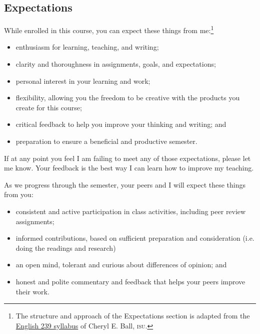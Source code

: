 \documentclass[12pt,oneside]{amsart}	%
\begin{document}




\subsection{Expectations} %
\label{sub:expectations}

While enrolled in this course, you can expect these things from me:\footnote{The structure and approach of the Expectations section is adapted from the \href{http://www.ceball.com/classes/239/spring09/?page_id=8}{English 239 syllabus} of Cheryl E. Ball, \textsc{isu}.}
\begin{itemize}
	\item enthusiasm for learning, teaching, and writing;
	\item clarity and thoroughness in assignments, goals, and expectations;
	\item personal interest in your learning and work;
	\item flexibility, allowing you the freedom to be creative with the products you create for this course;
	\item critical feedback to help you improve your thinking and writing; and
	\item preparation to ensure a beneficial and productive semester.
\end{itemize}
If at any point you feel I am failing to meet any of those expectations, please let me know. Your feedback is the best way I can learn how to improve my teaching.

As we progress through the semester, your peers and I will expect these things from you:
\begin{itemize}
	\item consistent and active participation in class activities, including peer review assignments;
	\item informed contributions, based on sufficient preparation and consideration (i.e. doing the readings and research)
	\item an open mind, tolerant and curious about differences of opinion; and
	\item honest and polite commentary and feedback that helps your peers improve their work.
\end{itemize}
\end{document}
